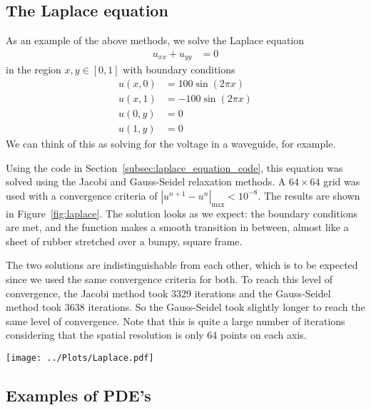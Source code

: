 \documentclass[twocolumn]{myarticle}
\begin{document}
\subsection{The Laplace equation}
\label{subsec:the_laplace_equation}

As an example of the above methods, we solve the Laplace equation
\begin{align}
    u_{xx} + u_{yy} &= 0
\end{align}
in the region $ x, y \in [0, 1] $ with boundary conditions
\begin{align}
    u(x,0) &= 100 \sin \left( 2 \pi x \right)
    \\
    u(x,1) &= -100 \sin \left( 2 \pi x \right)
    \\
    u(0, y) &= 0
    \\
    u(1, y) &= 0
\end{align}
We can think of this as solving for the voltage in a waveguide, for example.

Using the code in Section~\ref{subsec:laplace_equation_code}, this equation was solved using the Jacobi and Gauss-Seidel relaxation methods.
A $ 64 \times 64 $ grid was used with a convergence criteria of $ \left| u^{n+1} - u^{n} \right|_\text{max} < 10^{-8} $.
The results are shown in Figure~\ref{fig:laplace}.
The solution looks as we expect: the boundary conditions are met, and the function makes a smooth transition in between, almost like a sheet of rubber stretched over a bumpy, square frame.

The two solutions are indistinguishable from each other, which is to be expected since we used the same convergence criteria for both.
To reach this level of convergence, the Jacobi method took 3329 iterations and the Gauss-Seidel method took 3638 iterations.
So the Gauss-Seidel took slightly longer to reach the same level of convergence.
Note that this is quite a large number of iterations considering that the spatial resolution is only 64 points on each axis.

\begin{figure*}[ht]
    \centering
    \texttt{[image: ../Plots/Laplace.pdf]}
    \caption{Solutions to the Laplace equation as determined by the Jacobi and Gauss-Seidel relaxation methods.}
    \label{fig:laplace}
\end{figure*}

\subsection{Examples of PDE's}
\label{subsec:examples_of_pdes}
\end{document}

